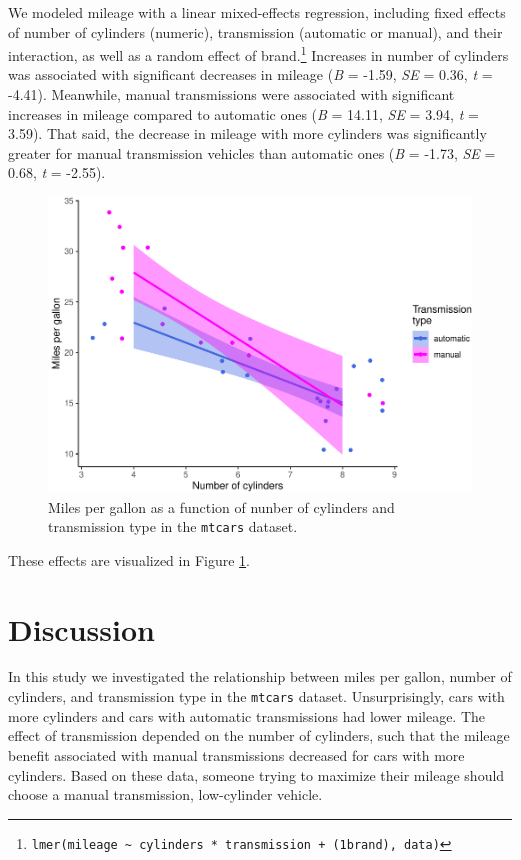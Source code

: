 \documentclass[
]{article}
\begin{document}
We modeled mileage with a linear mixed-effects regression, including fixed effects of number of cylinders (numeric), transmission (automatic or manual), and their interaction, as well as a random effect of brand.\footnote{\texttt{lmer(mileage\ \textasciitilde{}\ cylinders\ *\ transmission\ +\ (1\textbar{}brand),\ data)}} Increases in number of cylinders was associated with significant decreases in mileage (\emph{B} = -1.59, \emph{SE} = 0.36, \emph{t} = -4.41). Meanwhile, manual transmissions were associated with significant increases in mileage compared to automatic ones (\emph{B} = 14.11, \emph{SE} = 3.94, \emph{t} = 3.59). That said, the decrease in mileage with more cylinders was significantly greater for manual transmission vehicles than automatic ones (\emph{B} = -1.73, \emph{SE} = 0.68, \emph{t} = -2.55).

\begin{figure}
\centering
\includegraphics{mpg-report_files/figure-latex/plot-primary-results-1.pdf}
\caption{\label{fig:plot-primary-results}Miles per gallon as a function of nunber of cylinders and transmission type in the \texttt{mtcars} dataset.}
\end{figure}

These effects are visualized in Figure \ref{fig:plot-primary-results}.

\hypertarget{discussion}{%
\section{Discussion}\label{discussion}}

In this study we investigated the relationship between miles per gallon, number of cylinders, and transmission type in the \texttt{mtcars} dataset. Unsurprisingly, cars with more cylinders and cars with automatic transmissions had lower mileage. The effect of transmission depended on the number of cylinders, such that the mileage benefit associated with manual transmissions decreased for cars with more cylinders. Based on these data, someone trying to maximize their mileage should choose a manual transmission, low-cylinder vehicle.
\end{document}
